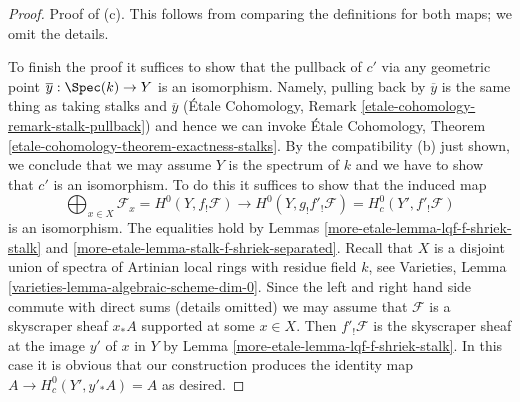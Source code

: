 \begin{proof}
\medskip\noindent
Proof of (c). This follows from comparing the definitions
for both maps; we omit the details.

\medskip\noindent
To finish the proof it suffices to show that the pullback of
$c'$ via any geometric point $\overline{y} : \Spec(k) \to Y$
is an isomorphism. Namely, pulling back by $\overline{y}$
is the same thing as taking stalks and $\overline{y}$
(\'Etale Cohomology, Remark \ref{etale-cohomology-remark-stalk-pullback})
and hence we can invoke
\'Etale Cohomology, Theorem \ref{etale-cohomology-theorem-exactness-stalks}.
By the compatibility (b) just shown, we
conclude that we may assume $Y$ is the spectrum of $k$
and we have to show that $c'$ is an isomorphism.
To do this it suffices to show that the induced map
$$
\bigoplus\nolimits_{x \in X} \mathcal{F}_x = H^0(Y, f_!\mathcal{F})
\longrightarrow
H^0(Y, g_!f'_!\mathcal{F}) = H^0_c(Y', f'_!\mathcal{F})
$$
is an isomorphism. The equalities hold by
Lemmas \ref{more-etale-lemma-lqf-f-shriek-stalk} and
\ref{more-etale-lemma-stalk-f-shriek-separated}.
Recall that $X$ is a disjoint union of
spectra of Artinian local rings with residue field $k$, see
Varieties, Lemma \ref{varieties-lemma-algebraic-scheme-dim-0}.
Since the left and right hand side commute with direct
sums (details omitted) we may assume that $\mathcal{F}$ is a skyscraper
sheaf $x_*A$ supported at some $x \in X$.
Then $f'_!\mathcal{F}$ is the skyscraper sheaf at the
image $y'$ of $x$ in $Y$ by Lemma \ref{more-etale-lemma-lqf-f-shriek-stalk}.
In this case it is obvious that our construction
produces the identity map $A \to H^0_c(Y', y'_*A) = A$
as desired.
\end{proof}

